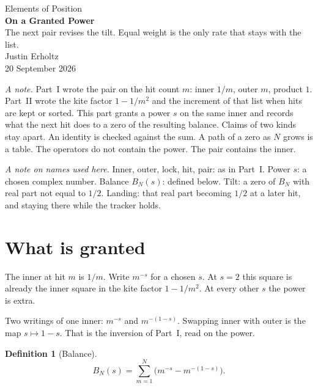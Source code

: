 \documentclass[10pt,a4paper]{article}
\theoremstyle{plain}
\theoremstyle{definition}
\newtheorem{definition}{Definition}
\theoremstyle{remark}
\begin{document}
\begin{center}
\vspace*{1.6em}
{\large Elements of Position}\\[1.4em]
{\LARGE\bfseries On a Granted Power}\\[0.5em]
{\small The next pair revises the tilt. Equal weight is the only rate that stays with the list.}\\[1.5em]
{\normalsize Justin Erholtz}\\[0.3em]
{\small 20 September 2026}
\end{center}

\vspace{1.2em}

\noindent
\textit{A note.}
Part~I wrote the pair on the hit count \(m\): inner \(1/m\), outer \(m\), product \(1\).
Part~II wrote the kite factor \(1-1/m^2\) and the increment of that list when hits are kept or sorted.
This part grants a power \(s\) on the same inner and records what the next hit does to a zero of the resulting balance.
Claims of two kinds stay apart.
An identity is checked against the sum.
A path of a zero as \(N\) grows is a table.
The operators do not contain the power.
The pair contains the inner.

\vspace{0.6em}
\noindent
\textit{A note on names used here.}
Inner, outer, lock, hit, pair: as in Part~I.
Power \(s\): a chosen complex number.
Balance \(B_N(s)\): defined below.
Tilt: a zero of \(B_N\) with real part not equal to \(1/2\).
Landing: that real part becoming \(1/2\) at a later hit, and staying there while the tracker holds.

\section{What is granted}

The inner at hit \(m\) is \(1/m\).
Write \(m^{-s}\) for a chosen \(s\).
At \(s=2\) this square is already the inner square in the kite factor \(1-1/m^2\).
At every other \(s\) the power is extra.

Two writings of one inner: \(m^{-s}\) and \(m^{-(1-s)}\).
Swapping inner with outer is the map \(s\mapsto 1-s\).
That is the inversion of Part~I, read on the power.

\begin{definition}[Balance]
\[
B_N(s)=\sum_{m=1}^{N}\bigl(m^{-s}-m^{-(1-s)}\bigr).
\]
\end{definition}
\end{document}
